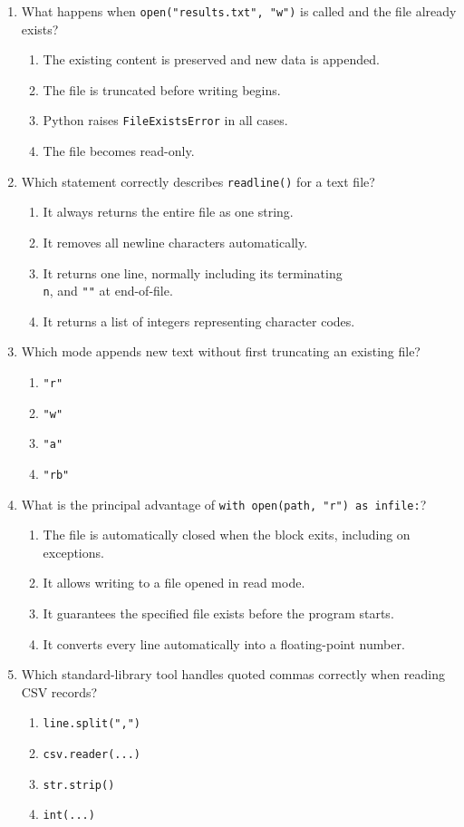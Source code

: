 \documentclass[11pt,a4paper]{article}
\begin{document}
\begin{enumerate}[label=\textbf{Q\arabic*.},leftmargin=2em,itemsep=1pt,topsep=1pt]
\item What happens when \texttt{open("results.txt", "w")} is called and the file already exists?
\begin{enumerate}[label=\Alph*.,leftmargin=2em]
\item The existing content is preserved and new data is appended.
\item The file is truncated before writing begins.
\item Python raises \texttt{FileExistsError} in all cases.
\item The file becomes read-only.
\end{enumerate}
\item Which statement correctly describes \texttt{readline()} for a text file?
\begin{enumerate}[label=\Alph*.,leftmargin=2em]
\item It always returns the entire file as one string.
\item It removes all newline characters automatically.
\item It returns one line, normally including its terminating \texttt{\\n}, and \texttt{""} at end-of-file.
\item It returns a list of integers representing character codes.
\end{enumerate}
\item Which mode appends new text without first truncating an existing file?
\begin{enumerate}[label=\Alph*.,leftmargin=2em]
\item \texttt{"r"} \item \texttt{"w"} \item \texttt{"a"} \item \texttt{"rb"}
\end{enumerate}
\item What is the principal advantage of \texttt{with open(path, "r") as infile:}?
\begin{enumerate}[label=\Alph*.,leftmargin=2em]
\item The file is automatically closed when the block exits, including on exceptions.
\item It allows writing to a file opened in read mode.
\item It guarantees the specified file exists before the program starts.
\item It converts every line automatically into a floating-point number.
\end{enumerate}
\item Which standard-library tool handles quoted commas correctly when reading CSV records?
\begin{enumerate}[label=\Alph*.,leftmargin=2em]
\item \texttt{line.split(",")} \item \texttt{csv.reader(...)} \item \texttt{str.strip()} \item \texttt{int(...)}
\end{enumerate}
\end{enumerate}
\end{document}
